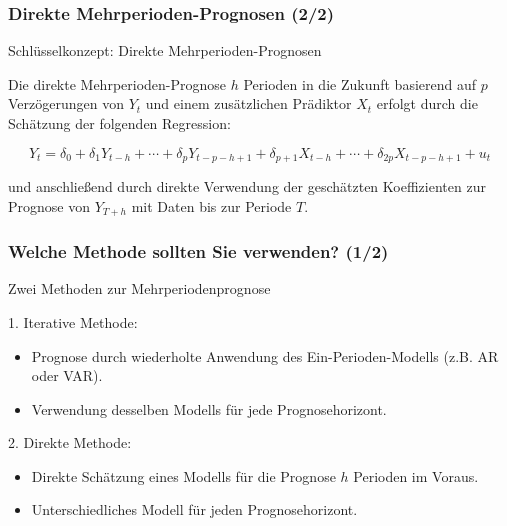 \documentclass[10pt,aspectratio=169]{beamer}\usepackage[]{graphicx}\usepackage[]{xcolor}
\begin{document}
\begin{frame}
  \frametitle{Direkte Mehrperioden-Prognosen \hfill (2/2)}


  \begin{alertblock}{Schl\"usselkonzept: Direkte Mehrperioden-Prognosen}

  Die direkte Mehrperioden-Prognose $h$ Perioden in die Zukunft basierend auf $p$ Verzögerungen von $Y_t$ und einem zusätzlichen Prädiktor $X_t$ erfolgt durch die Schätzung der folgenden Regression:

  \[
  Y_t = \delta_0 + \delta_1 Y_{t-h} + \cdots + \delta_p Y_{t-p-h+1} + \delta_{p+1} X_{t-h}
  + \cdots + \delta_{2p} X_{t-p-h+1} + u_t
  \]
  
  und anschließend durch direkte Verwendung der geschätzten Koeffizienten zur Prognose von $Y_{T+h}$ mit Daten bis zur Periode $T$.
  
	\end{alertblock}
  
\end{frame}



\begin{frame}
  \frametitle{Welche Methode sollten Sie verwenden? \hfill (1/2)}

  Zwei Methoden zur Mehrperiodenprognose
  
  1. Iterative Methode:
  \begin{itemize}
    \item Prognose durch wiederholte Anwendung des Ein-Perioden-Modells (z.B. AR oder VAR).
    \item Verwendung desselben Modells für jede Prognosehorizont.
  \end{itemize}
  
  2. Direkte Methode:
  \begin{itemize}
    \item Direkte Schätzung eines Modells für die Prognose $h$ Perioden im Voraus.
    \item Unterschiedliches Modell für jeden Prognosehorizont.
  \end{itemize}  

\end{frame}
\end{document}
